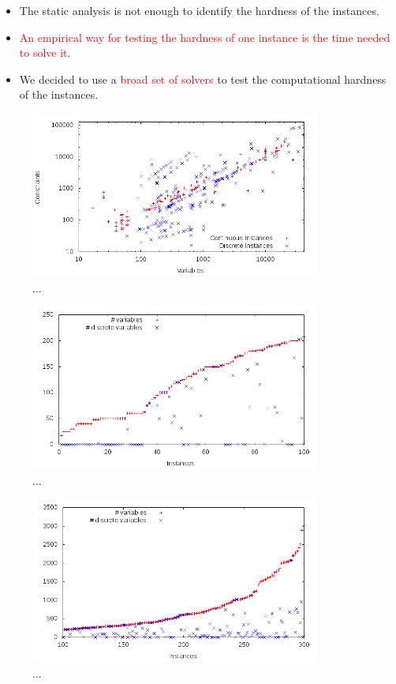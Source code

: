 \begin{itemize}
\item The static analysis is not enough to identify the hardness of the instances.
\item \textcolor{red}{An empirical way for testing the hardness of one instance is the time needed to solve it}.
\item We decided to use a \textcolor{red}{broad set of solvers} to test the computational hardness of the instances.
\end{itemize}



\begin{figure}\centering
  \includegraphics[width=0.85\textwidth]{pic_overview.png}
  \caption{...\label{fig:1}}
\end{figure}

\begin{figure}\centering
  \includegraphics[width=0.85\textwidth]{pic_var_small.png}
  \caption{...\label{fig:4}}
\end{figure}

\begin{figure}\centering
  \includegraphics[width=0.85\textwidth]{pic_var_medium.png}
  \caption{...\label{fig:3}}
\end{figure}


